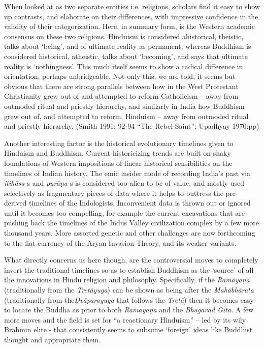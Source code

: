 When looked at as two separate entities i.e. religions, scholars find it easy to show up contrasts, and elaborate on their differences, with impressive confidence in the validity of their categorization. Here, in summary form, is the Western academic consensus on these two religions. Hinduism is considered ahistorical, theistic, talks about ‘being’, and of ultimate reality as permanent; whereas Buddhism is considered historical, atheistic, talks about ‘becoming’, and says that ultimate reality is ‘nothingness’. This much itself seems to show a radical difference in orientation, perhaps unbridgeable. Not only this, we are told, it seems but obvious that there are strong parallels between how in the West Protestant Christianity grew out of and attempted to reform Catholicism – away from outmoded ritual and priestly hierarchy, and similarly in India how Buddhism grew out of, and attempted to reform, Hinduism – away from outmoded ritual and priestly hierarchy. (Smith 1991: 92-94 “The Rebel Saint”; Upadhyay 1970:pp)

Another interesting factor is the historical evolutionary timelines given to Hinduism and Buddhism. Current historicizing trends are built on shaky foundations of Western impositions of linear historical sensibilities on the timelines of Indian history. The emic insider mode of recording India’s past via \textit{itihāsa-}s and \textit{purāṇa-}s is considered too alien to be of value, and mostly used selectively as fragmentary pieces of data where it helps to buttress the pre-derived timelines of the Indologists. Inconvenient data is thrown out or ignored until it becomes too compelling, for example the current excavations that are pushing back the timelines of the Indus Valley civilization complex by a few more thousand years. More assorted genetic and other challenges are now forthcoming to the fiat currency of the Aryan Invasion Theory, and its weaker variants.

What directly concerns us here though, are the controversial moves to completely invert the traditional timelines so as to establish Buddhism as the ‘source’ of all the innovations in Hindu religion and philosophy. Specifically, if the \textit{Rāmāyaṇa} (traditionally from the \textit{Tretāyuga}) can be shown as being after the \textit{Mahābhārata} (traditionally from the\textit{Dvāparayuga} that follows the \textit{Tretā}) then it becomes easy to locate the Buddha as prior to both \textit{Rāmāyaṇa} and the \textit{Bhagavad Gītā}. A few more moves and the field is set for “a reactionary Hinduism” – led by its wily Brahmin elite - that consistently seems to subsume ‘foreign’ ideas like Buddhist thought and appropriate them.

